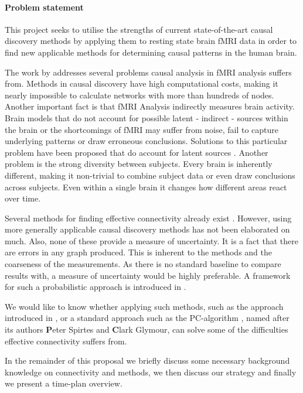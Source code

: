 \documentclass[a4paper, 10pt, english, onecolumn]{article}
\begin{document}
\paragraph{Problem statement}
This project seeks to utilise the strengths of current state-of-the-art causal discovery methods by applying them to resting state brain fMRI data in order to find new applicable methods for determining causal patterns in the human brain.

The work by \cite{ramsey2010} addresses several problems causal analysis in fMRI analysis suffers from.
Methods in causal discovery have high computational costs, making it nearly impossible to calculate networks with more than hundreds of nodes.
Another important fact is that fMRI Analysis indirectly measures brain activity.
Brain models that do not account for possible latent - indirect - sources within the brain or the shortcomings of fMRI may suffer from noise, fail to capture underlying patterns or draw erroneous conclusions.
Solutions to this particular problem have been proposed that do account for latent sources \cite{ramsey2010, waldorp2011}.
Another problem is the strong diversity between subjects.
Every brain is inherently different, making it non-trivial to combine subject data or even draw conclusions across subjects.
Even within a single brain it changes how different areas react over time.

Several methods for finding effective connectivity already exist \cite{mclntosh1994, harrison2003, friston2003, roebroeck2005}.
However, using more generally applicable causal discovery methods has not been elaborated on much.
Also, none of these provide a measure of uncertainty.
It is a fact that there are errors in any graph produced.
This is inherent to the methods and the coarseness of the measurements.
As there is no standard baseline to compare results with, a measure of uncertainty would be highly preferable.
A framework for such a probabilistic approach is introduced in \cite{claassen2012}.

We would like to know whether applying such methods, such as the approach introduced in \cite{claassen2012}, or a standard approach such as the PC-algorithm \cite{spirtes2000}, named after its authors \textbf{P}eter Spirtes and \textbf{C}lark Glymour, can solve some of the difficulties effective connectivity suffers from.

In the remainder of this proposal we briefly discuss some necessary background knowledge on connectivity and methods, we then discuss our strategy and finally we present a time-plan overview.
\end{document}
